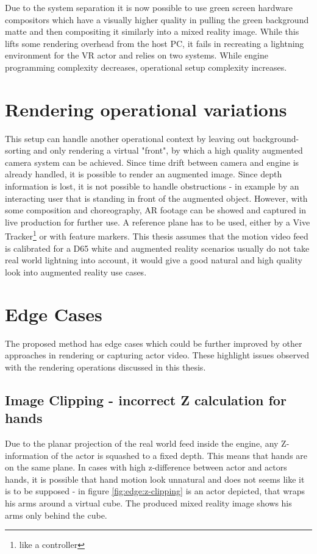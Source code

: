 Due to the system separation it is now possible to use green screen hardware 
compositors which have a visually higher quality in pulling the green 
background matte and then compositing it similarly into a mixed reality image. 
While this lifts some rendering overhead from the host PC, it fails in 
recreating a lightning environment for the VR actor and relies on two systems. 
While engine programming complexity decreases, operational setup complexity 
increases.

\section{Rendering operational variations}

This setup can handle another operational context by leaving out 
background-sorting and only rendering a virtual "front", by which a high 
quality augmented camera system can be achieved. Since time drift between 
camera and engine is already handled, it is possible to render an augmented 
image. Since depth information is lost, it is not possible to handle 
obstructions - in example by an interacting user that is standing in front of 
the augmented object. However, with some composition and choreography, AR 
footage can be showed and captured in live production for further use. A 
reference plane has to be used, either by a Vive Tracker\footnote{like a 
controller} or with feature markers.
\newline
This thesis assumes that the motion video feed is calibrated for a D65 white 
and augmented reality scenarios usually do not take real world lightning into 
account, it would give a good natural and high quality look into augmented 
reality use cases.

\section{Edge Cases}

The proposed method has edge cases which could be further improved by other 
approaches in rendering or capturing actor video. These highlight issues 
observed with the rendering operations discussed in this thesis.

\subsection{Image Clipping - incorrect Z calculation for hands}

Due to the planar projection of the real world feed inside the engine, any 
Z-information of the actor is squashed to a fixed depth. This means that hands 
are on the same plane. In cases with high z-difference between actor and actors 
hands, it is possible that hand motion look unnatural and does not seems like 
it is to be supposed - in figure \ref{fig:edge:z-clipping} is an actor 
depicted, that wraps his arms around a virtual cube. The produced mixed reality 
image shows his arms only behind the cube.


